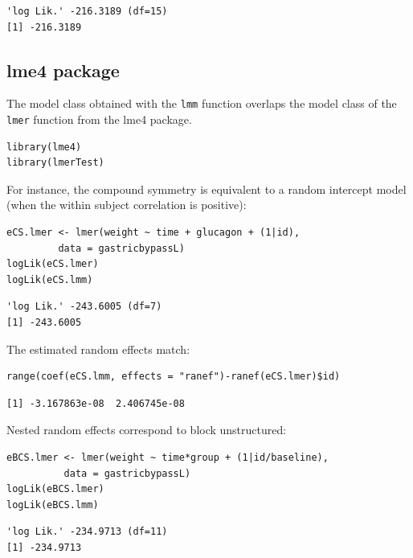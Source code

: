 \documentclass[12pt]{article}
\begin{document}
\begin{verbatim}
'log Lik.' -216.3189 (df=15)
[1] -216.3189
\end{verbatim}


\clearpage

\subsection{lme4 package}
\label{sec:org9949eff}

The model class obtained with the \texttt{lmm} function overlaps the model
class of the \texttt{lmer} function from the lme4 package.
\lstset{language=r,label= ,caption= ,captionpos=b,numbers=none}
\begin{lstlisting}
library(lme4)
library(lmerTest)
\end{lstlisting}

For instance, the compound symmetry is equivalent to a random
intercept model (when the within subject correlation is positive):
\lstset{language=r,label= ,caption= ,captionpos=b,numbers=none}
\begin{lstlisting}
eCS.lmer <- lmer(weight ~ time + glucagon + (1|id),
		 data = gastricbypassL)
logLik(eCS.lmer)
logLik(eCS.lmm)
\end{lstlisting}

\begin{verbatim}
'log Lik.' -243.6005 (df=7)
[1] -243.6005
\end{verbatim}


The estimated random effects match:
\lstset{language=r,label= ,caption= ,captionpos=b,numbers=none}
\begin{lstlisting}
range(coef(eCS.lmm, effects = "ranef")-ranef(eCS.lmer)$id)
\end{lstlisting}

\begin{verbatim}
[1] -3.167863e-08  2.406745e-08
\end{verbatim}


Nested random effects correspond to block unstructured:
\lstset{language=r,label= ,caption= ,captionpos=b,numbers=none}
\begin{lstlisting}
eBCS.lmer <- lmer(weight ~ time*group + (1|id/baseline),
		  data = gastricbypassL)
logLik(eBCS.lmer)
logLik(eBCS.lmm)
\end{lstlisting}

\begin{verbatim}
'log Lik.' -234.9713 (df=11)
[1] -234.9713
\end{verbatim}
\end{document}
